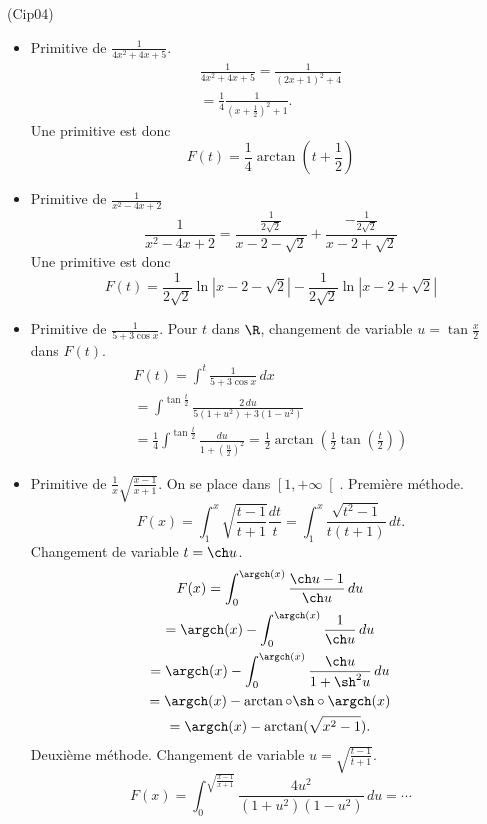 \begin{tiny}(Cip04)\end{tiny}
\begin{itemize}
 \item Primitive de $\frac{1}{4x^2+4x+5}$. 
\begin{multline*}
 \frac{1}{4x^2+4x+5}=\frac{1}{(2x+1)^2+4} \\
 = \frac{1}{4}\frac{1}{(x+\frac{1}{2})^2+1}.
\end{multline*}
Une primitive est donc
\begin{displaymath}
 F(t) = \frac{1}{4}\arctan(t+\frac{1}{2})
\end{displaymath}

 \item Primitive de $\frac{1}{x^2-4x+2} $
\begin{displaymath}
 \frac{1}{x^2-4x+2} = \frac{\frac{1}{2\sqrt{2}}}{x-2-\sqrt{2}}+ \frac{-\frac{1}{2\sqrt{2}}}{x-2+\sqrt{2}}
\end{displaymath}
Une primitive est donc
\begin{displaymath}
 F(t)= \frac{1}{2\sqrt{2}} \ln|x-2-\sqrt{2}| - \frac{1}{2\sqrt{2}} \ln|x-2+\sqrt{2}|
\end{displaymath}

 \item Primitive de $\frac{1}{5+3\cos x}$.
Pour $t$ dans $\R$, changement de variable $u=\tan \frac{x}{2}$ dans $F(t)$.
\begin{multline*}
 F(t) = \int^t\frac{1}{5+3\cos x}\,dx\\
 = \int^{\tan \frac{t}{2}}\frac{2\,du}{5(1+u^2)+3(1-u^2)}\\
= \frac{1}{4}\int^{\tan \frac{t}{2}}\frac{du}{1+(\frac{u}{2})^2}
= \frac{1}{2}\arctan\left(\frac{1}{2}\tan(\frac{t}{2}) \right) 
\end{multline*}

 \item Primitive de $\frac{1}{x}\sqrt{\frac{x-1}{x+1}}$. On se place dans $\left[ 1, +\infty\right[$.\newline
Première méthode.
\[
 F(x) = \int_1^{x}\sqrt{\frac{t-1}{t+1}}\frac{dt}{t}
 = \int_1^{x}\frac{\sqrt{t^2-1}}{t(t+1)}\,dt.
\]
Changement de variable $t = \ch u$.
\begin{multline*}
 F(x) = \int_{0}^{\argch(x)}\frac{\ch u -1}{\ch u}\, du \\
 = \argch(x) - \int_{0}^{\argch(x)}\frac{1}{\ch u}\, du \\
 = \argch(x) - \int_{0}^{\argch(x)}\frac{\ch u}{1 + \sh^2 u}\, du \\
 = \argch(x) - \arctan \circ \sh \circ \argch (x)\\
 = \argch(x) - \arctan(\sqrt{x^2 - 1}).
\end{multline*}
Deuxième méthode.\newline
Changement de variable $u = \sqrt{\frac{t-1}{t+1}}$.
\[
 F(x) = \int_{0}^{\sqrt{\frac{x-1}{x+1}}} \frac{4u^2}{(1+u^2)(1-u^2)}\,du = \cdots
\]
 

\end{itemize}
